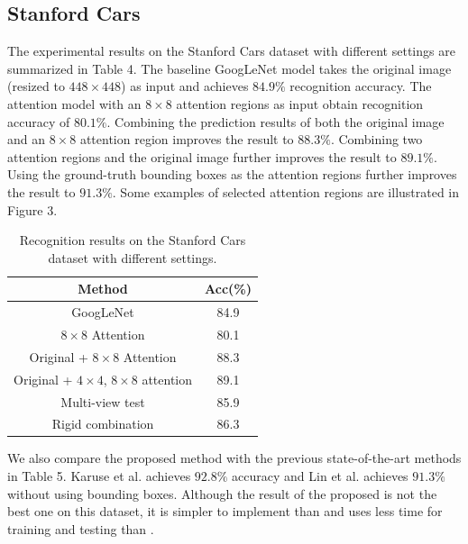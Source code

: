 \documentclass[runningheads]{llncs}
\begin{document}
\subsection{Stanford Cars}
The experimental results on the Stanford Cars dataset with different settings are summarized in Table 4.
The baseline GoogLeNet model takes the original image (resized to $448\times448$) as input and achieves $84.9\%$ recognition accuracy.
The attention model with an $8\times8$ attention regions as input obtain recognition accuracy of $80.1\%$.
Combining the prediction results of both the original image and an $8\times8$ attention region improves the result to $88.3\%$.
Combining two attention regions and the original image further improves the result to $89.1\%$.
Using the ground-truth bounding boxes as the attention regions further improves the result to $91.3\%$.
Some examples of selected attention regions are illustrated in Figure 3.

\begin{table}[htb]
\begin{center}
\begin{tabular}
{c|c}\hline
Method &   Acc(\%) \\\hline\hline
GoogLeNet  & 84.9 \\
$8\times8$ Attention  & 80.1 \\
Original + $8\times8$ Attention & 88.3 \\
Original + $4\times4$, $8\times8$ attention & 89.1 \\
Multi-view test  & 85.9 \\
Rigid combination & 86.3 \\\hline
\end{tabular}
\caption{Recognition results on the Stanford Cars dataset with different settings.}
\vspace{-8pt}
\end{center}
\end{table}

We also compare the proposed method with the previous state-of-the-art methods in Table 5.
Karuse et al. \cite{bd21} achieves $92.8\%$ accuracy and Lin et al. \cite{bd16} achieves $91.3\%$ without using bounding boxes.
Although the result of the proposed is not the best one on this dataset, it is simpler to implement than \cite{bd21} and uses less time for training and testing than \cite{bd16}.
\end{document}
